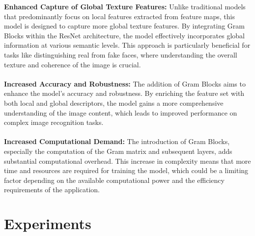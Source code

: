 \documentclass[rebuttal]{cvpr}
\begin{document}
\textbf{Enhanced Capture of Global Texture Features:} Unlike traditional models that predominantly focus on local features extracted from feature maps, this model is designed to capture more global texture features. By integrating Gram Blocks within the ResNet architecture, the model effectively incorporates global information at various semantic levels. This approach is particularly beneficial for tasks like distinguishing real from fake faces, where understanding the overall texture and coherence of the image is crucial.
\\
\\
\textbf{Increased Accuracy and Robustness:} The addition of Gram Blocks aims to enhance the model's accuracy and robustness. By enriching the feature set with both local and global descriptors, the model gains a more comprehensive understanding of the image content, which leads to improved performance on complex image recognition tasks.
\\
\\
\textbf{Increased Computational Demand:} The introduction of Gram Blocks, especially the computation of the Gram matrix and subsequent layers, adds substantial computational overhead. This increase in complexity means that more time and resources are required for training the model, which could be a limiting factor depending on the available computational power and the efficiency requirements of the application.

\section{Experiments}
\end{document}

